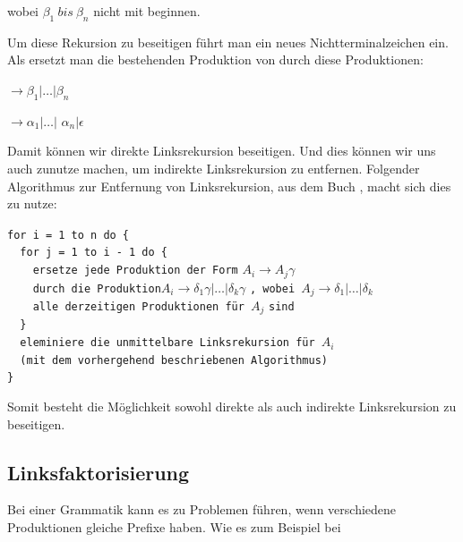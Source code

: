 \noindent wobei $\beta_1\ bis\ \beta_n$ nicht mit 
beginnen.\vspace{10pt}

\noindent Um diese Rekursion zu beseitigen führt man ein neues
Nichtterminalzeichen  ein. Als ersetzt man die bestehenden Produktion von
 durch diese Produktionen:\vspace{10pt}

 $\to \beta_1 | \ldots | \beta_n$

 $\to \alpha_1$$|\ldots|$
$\alpha_n$$|\epsilon$\vspace{10pt}

\noindent Damit können wir direkte Linksrekursion beseitigen. Und dies können wir
uns auch zunutze machen, um indirekte Linksrekursion zu entfernen. Folgender
Algorithmus zur Entfernung von Linksrekursion, aus dem Buch \cite{Compilers},
macht sich dies zu nutze:\vspace{10pt}

\noindent
\verb|for i = 1 to n do {|\\
\verb|  for j = 1 to i - 1 do {|\\
\verb|    ersetze jede Produktion der Form| $A_i \to A_j \gamma$ \verb| |\\ 
\verb|    durch die Produktion|$A_i \to \delta_1\gamma|\ldots|\delta_k\gamma$
\verb|, wobei |$A_j \to \delta_1|\ldots|\delta_k$\\ 
\verb|    alle derzeitigen Produktionen für |$A_j$ \verb|sind|\\ 
\verb|  }|\\
\verb|  eleminiere die unmittelbare Linksrekursion für |$A_i$\\
\verb|  (mit dem vorhergehend beschriebenen Algorithmus)|\\
\verb|}|
\vspace{10pt}

Somit besteht die Möglichkeit sowohl direkte als auch indirekte Linksrekursion
zu beseitigen.\vspace{10pt}

\subsection{Linksfaktorisierung}

Bei einer Grammatik kann es zu Problemen führen, wenn verschiedene Produktionen
gleiche Prefixe haben. Wie es zum Beispiel bei \vspace{10pt}

